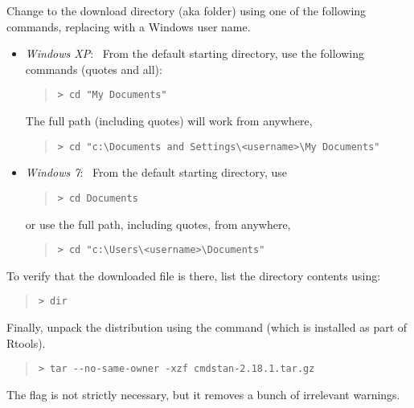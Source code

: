 Change to the download directory (aka folder) using one of the
following commands, replacing  with
a Windows user name.
%
\begin{itemize}
\item \emph{Windows XP}: \ From the default starting directory, use
the following commands (quotes and all):
\begin{quote}
\begin{Verbatim}[fontshape=sl,fontsize=\small]
> cd "My Documents"
\end{Verbatim}
\end{quote}
%
The full path (including quotes) will work from anywhere,
\begin{quote}
\begin{Verbatim}[fontshape=sl,fontsize=\small]
> cd "c:\Documents and Settings\<username>\My Documents"
\end{Verbatim}
\end{quote}
\item \emph{Windows 7}:  \  From the default starting directory, use
\begin{quote}
\begin{Verbatim}[fontshape=sl,fontsize=\small]
> cd Documents
\end{Verbatim}
\end{quote}
or use the full path, including quotes, from anywhere,
\begin{quote}
\begin{Verbatim}[fontshape=sl,fontsize=\small]
> cd "c:\Users\<username>\Documents"
\end{Verbatim}
\end{quote}
\end{itemize}
%
To verify that the downloaded \CmdStan {} file is there,
list the directory contents using:
%
\begin{quote}
\begin{Verbatim}[fontshape=sl,fontsize=\small]
> dir
\end{Verbatim}
\end{quote}

Finally, unpack the distribution using the  command (which
is installed as part of Rtools).
%
\begin{quote}
\begin{Verbatim}[fontshape=sl,fontsize=\small]
> tar --no-same-owner -xzf cmdstan-2.18.1.tar.gz 
\end{Verbatim}
\end{quote}
%
The  flag is not strictly necessary,
but it removes a bunch of irrelevant warnings.


